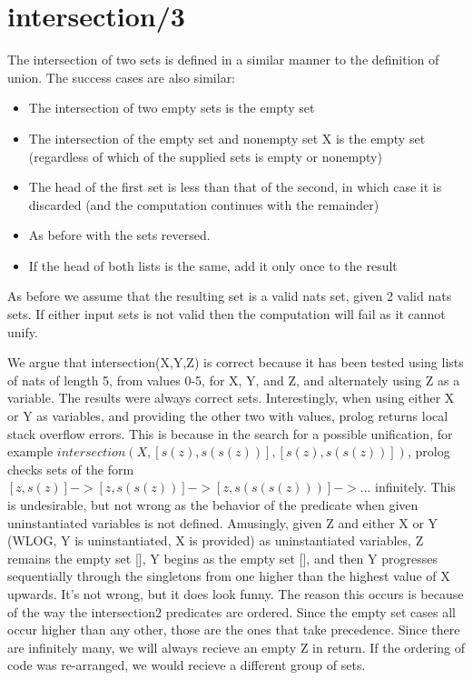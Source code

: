 \documentclass{article}
\begin{document}
\section{intersection/3}
The intersection of two sets is defined in a similar manner to the definition of union. The success cases are also similar:
\begin{itemize}
    \item The intersection of two empty sets is the empty set

    \item The intersection of the empty set and nonempty set X is the empty set (regardless of which of the supplied sets is empty or nonempty)

    \item The head of the first set is less than that of the second, in which case it is discarded (and the computation continues with the remainder)
    
    \item As before with the sets reversed.

    \item If the head of both lists is the same, add it only once to the result

\end{itemize}
As before we assume that the resulting set is a valid nats set, given 2 valid nats sets. If either input sets is not valid then the computation will fail as it cannot unify.

We argue that intersection(X,Y,Z) is correct because it has been tested using lists of nats of length 5, from values 0-5, for X, Y, and Z, and alternately using Z as a variable. The results were always correct sets. Interestingly, when using either X or Y as variables, and providing the other two with values, prolog returns local stack overflow errors. This is because in the search for a possible unification, for example $intersection(X, [s(z),s(s(z))], [s(z),s(s(z))])$, prolog checks sets of the form $[z,s(z)] -> [z,s(s(z))] -> [z, s(s(s(z)))] -> ...$ infinitely. This is undesirable, but not wrong as the behavior of the predicate when given uninstantiated variables is not defined. Amusingly, given Z and either X or Y (WLOG, Y is uninstantiated, X is provided) as uninstantiated variables, Z remains the empty set [], Y begins as the empty set [], and then Y progresses sequentially through the singletons from one higher than the highest value of X upwards. It's not wrong, but it does look funny. The reason this occurs is because of the way the intersection2 predicates are ordered. Since the empty set cases all occur higher than any other, those are the ones that take precedence. Since there are infinitely many, we will always recieve an empty Z in return. If the ordering of code was re-arranged, we would recieve a different group of sets.
\end{document}
